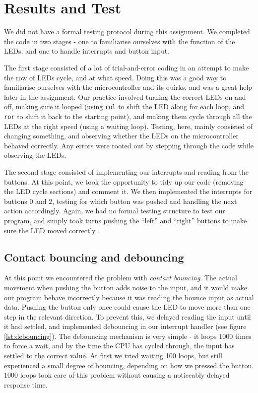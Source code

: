 \section{Results and Test}
We did not have a formal testing protocol during this assignment. We completed the code in two stages - one to familiarise ourselves with the function of the LEDs, and one to handle interrupts and button input. 

The first stage consisted of a lot of trial-and-error coding in an attempt to make the row of LEDs cycle, and at what speed. Doing this was a good way to familiarise ourselves with the microcontroller and its quirks, and was a great help later in the assignment. Our practice involved turning the correct LEDs on and off, making sure it looped (using \texttt{rol} to shift the LED along for each loop, and \texttt{ror} to shift it back to the starting point), and making them cycle through all the LEDs at the right speed (using a waiting loop). Testing, here, mainly consisted of changing something, and observing whether the LEDs on the microcontroller behaved correctly. Any errors were rooted out by stepping through the code while observing the LEDs.

The second stage consisted of implementing our interrupts and reading from the buttons. At this point, we took the opportunity to tidy up our code (removing the LED cycle sections) and comment it. We then implemented the interrupts for buttons 0 and 2, testing for which button was pushed and handling the next action accordingly. Again, we had no formal testing structure to test our program, and simply took turns pushing the ``left'' and ``right'' buttons to make sure the LED moved correctly. 

\subsection{Contact bouncing and debouncing}
At this point we encountered the problem with {\em contact bouncing}. The actual movement when pushing the button adds noise to the input, and it would make our program behave incorrectly because it was reading the bounce input as actual data. Pushing the button only once could cause the LED to move more than one step in the relevant direction. To prevent this, we delayed reading the input until it had settled, and implemented debouncing in our interrupt handler (see figure \ref{lst:debouncing}). The debouncing mechanism is very simple - it loops 1000 times to force a wait, and by the time the CPU has cycled through, the input has settled to the correct value. At first we tried waiting 100 loops, but still experienced a small degree of bouncing, depending on how we pressed the button. 1000 loops took care of this problem without causing a noticeably delayed response time.


